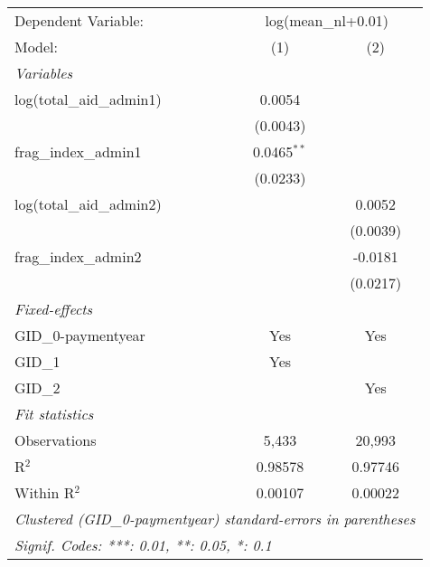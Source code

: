 \begingroup
\centering
\begin{tabular}{lcc}
   \tabularnewline \midrule \midrule
   Dependent Variable: & \multicolumn{2}{c}{log(mean\_nl+0.01)}\\
   Model:                    & (1)           & (2)\\  
   \midrule
   \emph{Variables}\\
   log(total\_aid\_admin1)   & 0.0054        &   \\   
                             & (0.0043)      &   \\   
   frag\_index\_admin1       & 0.0465$^{**}$ &   \\   
                             & (0.0233)      &   \\   
   log(total\_aid\_admin2)   &               & 0.0052\\   
                             &               & (0.0039)\\   
   frag\_index\_admin2       &               & -0.0181\\   
                             &               & (0.0217)\\   
   \midrule
   \emph{Fixed-effects}\\
   GID\_0-paymentyear        & Yes           & Yes\\  
   GID\_1                    & Yes           & \\  
   GID\_2                    &               & Yes\\  
   \midrule
   \emph{Fit statistics}\\
   Observations              & 5,433         & 20,993\\  
   R$^2$                     & 0.98578       & 0.97746\\  
   Within R$^2$              & 0.00107       & 0.00022\\  
   \midrule \midrule
   \multicolumn{3}{l}{\emph{Clustered (GID\_0-paymentyear) standard-errors in parentheses}}\\
   \multicolumn{3}{l}{\emph{Signif. Codes: ***: 0.01, **: 0.05, *: 0.1}}\\
\end{tabular}
\par\endgroup



